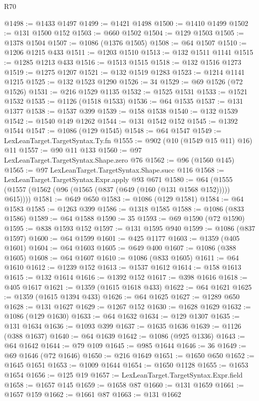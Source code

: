 \begin{lexlean}{R70}
\begin{coremodule}
@1498 := @1433 @1497
@1499 := @1421 @1498
@1500 := @1410 @1499
@1502 := @131 @1500 @152
@1503 := @660 @1502
@1504 := @129 @1503
@1505 := @1378 @1504
@1507 := @1086 (@1376 @1505)
@1508 := @64 @1507
@1510 := @1206 @1215 @433
@1511 := @1203 @1510
@1513 := @132 @1511 @1141
@1515 := @1285 @1213 @433
@1516 := @1513 @1515
@1518 := @132 @1516 @1273
@1519 := @1275 @1207
@1521 := @132 @1519 @1283
@1523 := @1214 @1141 @1215
@1525 := @132 @1523 @1290
@1526 := 34
@1529 := @69 @1526 (@72 @1526)
@1531 := @216 @1529 @1135
@1532 := @1525 @1531
@1533 := @1521 @1532
@1535 := @1126 (@1518 @1533)
@1536 := @64 @1535
@1537 := @131 @1377
@1538 := @1537 @399
@1539 := @158 @1538
@1540 := @132 @1539
@1542 := @1540 @149 @1262
@1544 := @131 @1542 @152
@1545 := @1392 @1544
@1547 := @1086 (@129 @1545)
@1548 := @64 @1547
@1549 := LexLeanTarget.TargetSyntax.Ty.fn
@1555 := @902 (@10 (@1549 @15 @11) @16) @11
@1557 := @90 @11 @133
@1560 := @97 LexLeanTarget.TargetSyntax.Shape.zero @76
@1562 := @96 (@1560 @145)
@1565 := @97 LexLeanTarget.TargetSyntax.Shape.succ @116
@1568 := LexLeanTarget.TargetSyntax.Expr.apply @93 @671
@1580 := @64 (@1555 (@1557 (@1562 (@96 (@1565 (@837 (@649 (@160 (@131 @1568 @152))))) @615))))
@1581 := @649 @650
@1583 := @1086 (@129 @1581)
@1584 := @64 @1583
@1585 := @1263 @399
@1586 := @1318 @1585
@1588 := @1086 (@833 @1586)
@1589 := @64 @1588
@1590 := 35
@1593 := @69 @1590 (@72 @1590)
@1595 := @838 @1593 @152
@1597 := @131 @1595 @940
@1599 := @1086 (@837 @1597)
@1600 := @64 @1599
@1601 := @425 @1177
@1603 := @1359 (@405 @1601)
@1604 := @64 @1603
@1605 := @649 @400
@1607 := @1086 (@388 @1605)
@1608 := @64 @1607
@1610 := @1086 (@833 @1605)
@1611 := @64 @1610
@1612 := @1239 @152
@1613 := @1537 @1612
@1614 := @158 @1613
@1615 := @132 @1614
@1616 := @1392 @152
@1617 := @398 @1616
@1618 := @405 @1617
@1621 := @1359 (@1615 @1618 @433)
@1622 := @64 @1621
@1625 := @1359 (@1615 @1394 @433)
@1626 := @64 @1625
@1627 := @1289 @650
@1628 := @131 @1627
@1629 := @1267 @152
@1630 := @1628 @1629
@1632 := @1086 (@129 @1630)
@1633 := @64 @1632
@1634 := @129 @1307
@1635 := @131 @1634
@1636 := @1093 @399
@1637 := @1635 @1636
@1639 := @1126 (@388 @1637)
@1640 := @64 @1639
@1642 := @1086 (@925 @1336)
@1643 := @64 @1642
@1644 := @79 @109
@1645 := @985 @1644
@1646 := 36
@1649 := @69 @1646 (@72 @1646)
@1650 := @216 @1649
@1651 := @1650 @650
@1652 := @1645 @1651
@1653 := @1009 @1644
@1654 := @1650 @1128
@1655 := @1653 @1654
@1656 := @125 @19
@1657 := LexLeanTarget.TargetSyntax.Expr.field
@1658 := @1657 @145
@1659 := @1658 @87
@1660 := @131 @1659
@1661 := @1657 @159
@1662 := @1661 @87
@1663 := @131 @1662

\end{coremodule}
\end{lexlean}
